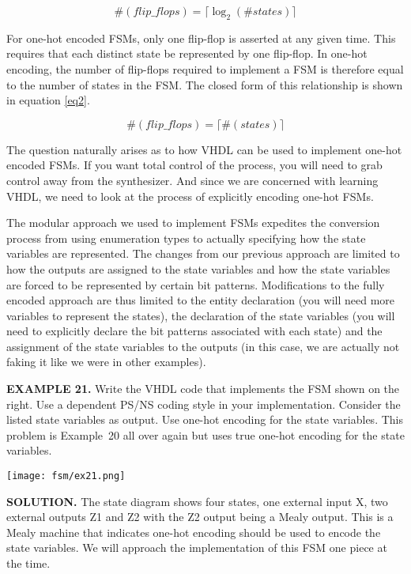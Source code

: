 \begin{equation}\label{eq1}
 \#(flip\_flops) = \lceil \log_2(\#states) \rceil
\end{equation}

For one-hot encoded FSMs, only one flip-flop is asserted at any given time. This requires that each distinct state be represented by one flip-flop. In one-hot encoding, the number of flip-flops required to implement a FSM is therefore equal to the number of states in the FSM. The closed form of this relationship is shown in equation \ref{eq2}. 

\begin{equation}\label{eq2}
 \#(flip\_flops) = \lceil \#(states) \rceil
\end{equation}

The question naturally arises as to how VHDL can be used to implement one-hot encoded FSMs. If you want total control of the process, you will need to grab control away from the synthesizer. And since we are concerned with learning VHDL, we need to look at the process of explicitly encoding one-hot FSMs. 

The modular approach we used to implement FSMs expedites the conversion process from using enumeration types to actually specifying how the state variables are represented. The changes from our previous approach are limited to how the outputs are assigned to the state variables and how the state variables are forced to be represented by certain bit patterns. Modifications to the fully encoded approach are thus limited to the entity declaration (you will need more variables to represent the states), the declaration of the state variables (you will need to explicitly declare the bit patterns associated with each state) and the assignment of the state variables to the outputs (in this case, we are actually not faking it like we were in other examples). 

\begin{leftbar}
\begin{minipage}[t]{0.5\textwidth}
\vspace{10pt}
\noindent
\textbf{EXAMPLE 21.}
Write the VHDL code that implements the FSM shown on the right. Use a dependent PS/NS coding style in your implementation. Consider the listed state variables as output. Use one-hot encoding for the state variables. This problem is Example~20 all over again but uses true one-hot encoding for the state variables. 
\vspace{50px}
\end{minipage}
\begin{minipage}[t]{0.47\textwidth}
\vspace{0pt}\raggedright
    \centering
	\texttt{[image: fsm/ex21.png]}
\end{minipage}
\end{leftbar}
\noindent
\textbf{SOLUTION.} The state diagram shows four states, one external input X, two external outputs Z1 and Z2 with the Z2 output being a Mealy output. This is a Mealy machine that indicates one-hot encoding should be used to encode the state variables. We will approach the implementation of this FSM one piece at the time.

